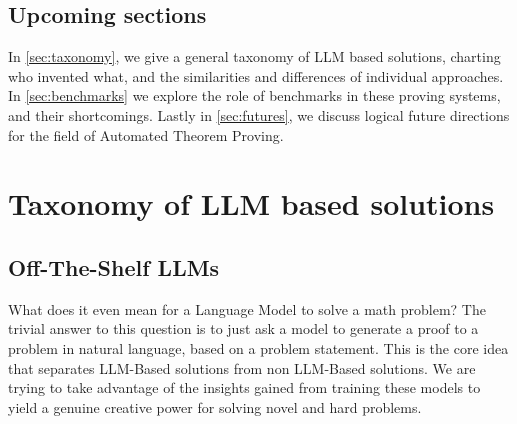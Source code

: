 \documentclass[12pt, letterpaper]{article}
\begin{document}
\subsection{Upcoming sections}

In \autoref{sec:taxonomy}, we give a general taxonomy of LLM based solutions, charting who invented what, and the similarities and differences of individual approaches. In \autoref{sec:benchmarks} we explore the role of benchmarks in these proving systems, and their shortcomings. Lastly in \autoref{sec:futures}, we discuss logical future directions for the field of Automated Theorem Proving. 
\section{Taxonomy of LLM based solutions}
\label{sec:taxonomy}



\subsection{Off-The-Shelf LLMs}

What does it even mean for a Language Model to solve a math problem? The trivial answer to this question is to just ask a model to generate a proof to a problem in natural language, based on a problem statement. This is the core idea that separates LLM-Based solutions from non LLM-Based solutions. We are trying to take advantage of the insights gained from training these models to yield a genuine creative power for solving novel and hard problems. 
\end{document}
